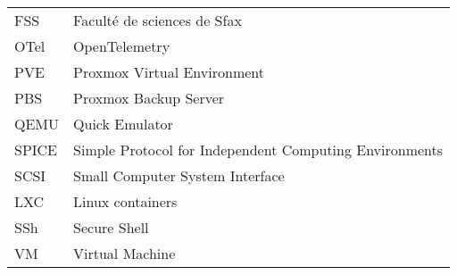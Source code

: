 \begin{longtable*}{p{3cm}p{10cm}}
	FSS & Faculté de sciences de Sfax \\
	OTel & OpenTelemetry \\
	PVE & Proxmox Virtual Environment \\
	PBS & Proxmox Backup Server \\
	QEMU & Quick Emulator \\
	SPICE & Simple Protocol for Independent Computing Environments \\
	SCSI & Small Computer System Interface \\
	LXC & Linux containers \\
	SSh & Secure Shell \\
	VM & Virtual Machine \\
\end{longtable*}
